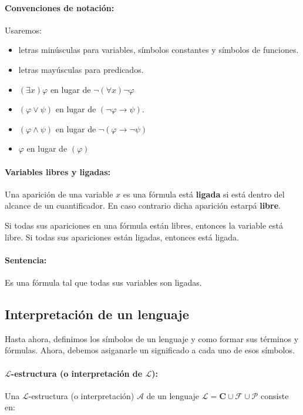 \paragraph{Convenciones de notación:} Usaremos:
\begin{itemize}
	\item letras minúsculas para variables, símbolos constantes y símbolos de funciones.
	\item letras mayúsculas para predicados.
	\item $(\exists x)\varphi$ en lugar de $\lnot(\forall x) \lnot\varphi$
	\item $(\varphi \lor \psi)$ en lugar de $(\lnot\varphi\rightarrow\psi)$.
	\item $(\varphi \land \psi)$ en lugar de $\lnot(\varphi\rightarrow\lnot\psi)$
	\item $\varphi$ en lugar de $(\varphi)$
\end{itemize}

\paragraph{Variables libres y ligadas:} Una aparición de una variable $x$ es una fórmula está \textbf{ligada} si está dentro del alcance de un cuantificador. En caso contrario dicha aparición estarpá \textbf{libre}.

Si todas sus apariciones en una fórmula están libres, entonces la variable está libre. Si todas sus apariciones están ligadas, entonces está ligada.

\paragraph{Sentencia:} Es una fórmula tal que todas sus variables son ligadas.

\subsection{Interpretación de un lenguaje}
Hasta ahora, definimos los símbolos de un lenguaje y como formar sus términos y fórmulas. Ahora, debemos asiganarle un significado a cada uno de esos símbolos.
\paragraph{$\mathcal{L}$-estructura (o interpretación de $\mathcal{L}$):} Una $\mathcal{L}$-estructura (o interpretación) $\mathcal{A}$ de un lenguaje $\mathcal{L} = \mathbf{C}\cup\mathcal{F}\cup\mathcal{P}$ consiste en:

